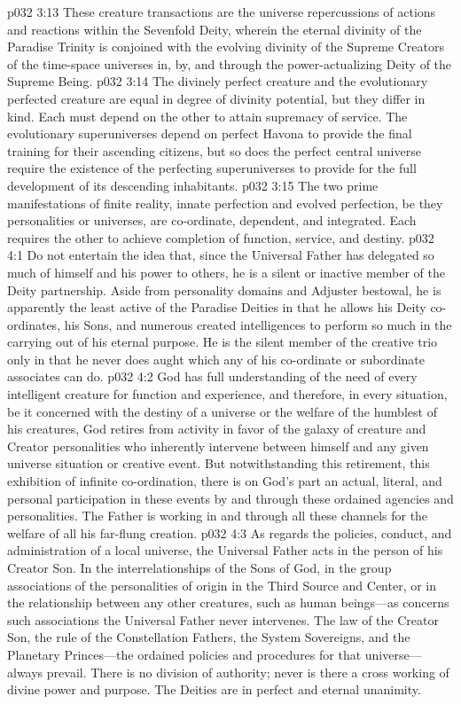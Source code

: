 \vs p032 3:13 These creature transactions are the universe repercussions of actions and reactions within the Sevenfold Deity, wherein the eternal divinity of the Paradise Trinity is conjoined with the evolving divinity of the Supreme Creators of the time\hyp{}space universes in, by, and through the power\hyp{}actualizing Deity of the Supreme Being.
\vs p032 3:14 The divinely perfect creature and the evolutionary perfected creature are equal in degree of divinity potential, but they differ in kind. Each must depend on the other to attain supremacy of service. The evolutionary superuniverses depend on perfect Havona to provide the final training for their ascending citizens, but so does the perfect central universe require the existence of the perfecting superuniverses to provide for the full development of its descending inhabitants.
\vs p032 3:15 The two prime manifestations of finite reality, innate perfection and evolved perfection, be they personalities or universes, are co\hyp{}ordinate, dependent, and integrated. Each requires the other to achieve completion of function, service, and destiny.
\vs p032 4:1 Do not entertain the idea that, since the Universal Father has delegated so much of himself and his power to others, he is a silent or inactive member of the Deity partnership. Aside from personality domains and Adjuster bestowal, he is apparently the least active of the Paradise Deities in that he allows his Deity co\hyp{}ordinates, his Sons, and numerous created intelligences to perform so much in the carrying out of his eternal purpose. He is the silent member of the creative trio only in that he never does aught which any of his co\hyp{}ordinate or subordinate associates can do.
\vs p032 4:2 God has full understanding of the need of every intelligent creature for function and experience, and therefore, in every situation, be it concerned with the destiny of a universe or the welfare of the humblest of his creatures, God retires from activity in favor of the galaxy of creature and Creator personalities who inherently intervene between himself and any given universe situation or creative event. But notwithstanding this retirement, this exhibition of infinite co\hyp{}ordination, there is on God’s part an actual, literal, and personal participation in these events by and through these ordained agencies and personalities. The Father is working in and through all these channels for the welfare of all his far\hyp{}flung creation.
\pc \vs p032 4:3 As regards the policies, conduct, and administration of a local universe, the Universal Father acts in the person of his Creator Son. In the interrelationships of the Sons of God, in the group associations of the personalities of origin in the Third Source and Center, or in the relationship between any other creatures, such as human beings---as concerns such associations the Universal Father never intervenes. The law of the Creator Son, the rule of the Constellation Fathers, the System Sovereigns, and the Planetary Princes---the ordained policies and procedures for that universe---always prevail. There is no division of authority; never is there a cross working of divine power and purpose. The Deities are in perfect and eternal unanimity.
